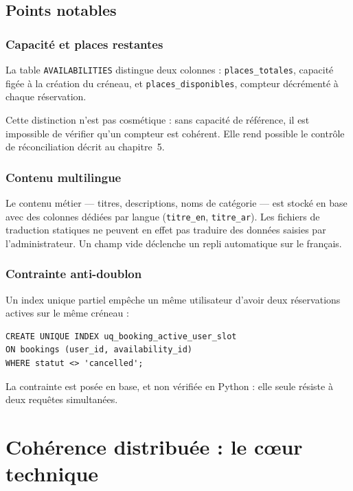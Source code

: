 \documentclass[11pt,a4paper]{report}
\begin{document}
\section{Points notables}

\subsection{Capacité et places restantes}

La table \texttt{AVAILABILITIES} distingue deux colonnes :
\texttt{places\_totales}, capacité figée à la création du créneau, et
\texttt{places\_disponibles}, compteur décrémenté à chaque réservation.

Cette distinction n'est pas cosmétique : sans capacité de référence, il est
impossible de vérifier qu'un compteur est cohérent. Elle rend possible le
contrôle de réconciliation décrit au chapitre~5.

\subsection{Contenu multilingue}

Le contenu métier — titres, descriptions, noms de catégorie — est stocké en base
avec des colonnes dédiées par langue (\texttt{titre\_en}, \texttt{titre\_ar}).
Les fichiers de traduction statiques ne peuvent en effet pas traduire des
données saisies par l'administrateur. Un champ vide déclenche un repli
automatique sur le français.

\subsection{Contrainte anti-doublon}

Un index unique partiel empêche un même utilisateur d'avoir deux réservations
actives sur le même créneau :

\begin{lstlisting}
CREATE UNIQUE INDEX uq_booking_active_user_slot
ON bookings (user_id, availability_id)
WHERE statut <> 'cancelled';
\end{lstlisting}

La contrainte est posée en base, et non vérifiée en Python : elle seule résiste
à deux requêtes simultanées.

\chapter{Cohérence distribuée : le cœur technique}
\end{document}
